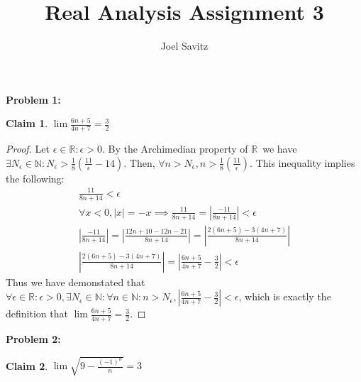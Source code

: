 \documentclass{article}
\title{Real Analysis Assignment 3}
\author{Joel Savitz}
\newcommand{\reals}{\ensuremath{\mathbb{R}}}
\newcommand{\nats}{\ensuremath{\mathbb{N}}}
\newcommand{\eps}{\ensuremath{\epsilon}}
\newcommand{\neps}{\ensuremath{N_\epsilon}}
\newtheorem{clm}{Claim}
\begin{document}
\maketitle

\textbf{Problem 1:}

\begin{clm} \label{c1}
	$\lim \frac{6n+5}{4n+7} = \frac{3}{2}$
\end{clm}

\begin{proof}
	Let $\eps \in \reals : \eps > 0$.
	By the Archimedian property of \reals\,
	we have $\exists N_\eps \in \nats: N_\eps > \frac{1}{8}(\frac{11}{\eps} - 14)$.
	Then, $\forall n > N_\eps, n > \frac{1}{8}(\frac{11}{\eps})$.
	This inequality implies the following: 
	\begin{align}
		\frac{11}{8n+14} < \eps \\
		\forall x < 0, |x| = -x \implies \frac{11}{8n+14} = |\frac{-11}{8n+14}| < \eps \\
	|\frac{-11}{8n+14}| = |\frac{12n + 10 - 12n - 21}{8n+14}| = |\frac{2(6n+5) - 3(4n+7)}{8n+14}| \\
	|\frac{2(6n+5) - 3(4n+7)}{8n+14}| = |\frac{6n+5}{4n+7} - \frac{3}{2}| < \eps
	\end{align}
	Thus we have demonstated that $\forall \eps \in \reals : \eps > 0, \exists \neps \in \nats:
	\forall n \in \nats: n > \neps, |\frac{6n+5}{4n+7} - \frac{3}{2}| < \eps$,
	which is exactly the definition that
	$\lim \frac{6n+5}{4n+7} = \frac{3}{2}$.
\end{proof}

\textbf{Problem 2:}

\begin{clm} \label{c2}
	$\lim \sqrt{9-\frac{(-1)^n}{n}} = 3$
\end{clm}
\end{document}
